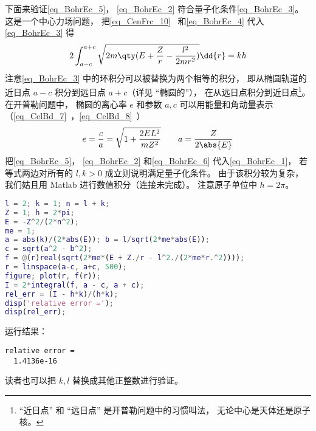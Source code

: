 下面来验证\autoref{eq_BohrEc_5}， \autoref{eq_BohrEc_2} 符合量子化条件\autoref{eq_BohrEc_3}。 这是一个中心力场问题， 把\autoref{eq_CenFrc_10}~ 和\autoref{eq_BohrEc_4}  代入\autoref{eq_BohrEc_3} 得
\begin{equation}\label{eq_BohrEc_1}
2\int_{a-c}^{a+c} \sqrt{2m\qty(E + \frac{Z}{r} - \frac{l^2}{2mr^2})} \dd{r} = kh
\end{equation}
注意\autoref{eq_BohrEc_3} 中的环积分可以被替换为两个相等的积分， 即从椭圆轨道的近日点 $a-c$ 积分到远日点 $a+c$（详见 “椭圆的”）， 在从远日点积分到近日点\footnote{“近日点” 和 “远日点” 是开普勒问题中的习惯叫法， 无论中心是天体还是原子核。}。 在开普勒问题中， 椭圆的离心率 $e$ 和参数 $a, c$ 可以用能量和角动量表示（\autoref{eq_CelBd_7}~，\autoref{eq_CelBd_8}~）
\begin{equation}\label{eq_BohrEc_6}
e = \frac{c}{a} = \sqrt{1 + \frac{2EL^2}{mZ^2}}
\qquad
a = \frac{Z}{2\abs{E}}
\end{equation}
把\autoref{eq_BohrEc_5}， \autoref{eq_BohrEc_2} 和\autoref{eq_BohrEc_6} 代入\autoref{eq_BohrEc_1}， 若等式两边对所有的 $l,k > 0$ 成立则说明满足量子化条件。 由于该积分较为复杂， 我们姑且用 Matlab 进行数值积分（连接未完成）。 注意原子单位中 $h = 2\pi$。
\begin{lstlisting}[language=matlab]
l = 2; k = 1; n = l + k;
Z = 1; h = 2*pi;
E = -Z^2/(2*n^2);
me = 1;
a = abs(k)/(2*abs(E)); b = l/sqrt(2*me*abs(E));
c = sqrt(a^2 - b^2);
f = @(r)real(sqrt(2*me*(E + Z./r - l^2./(2*me*r.^2))));
r = linspace(a-c, a+c, 500);
figure; plot(r, f(r));
I = 2*integral(f, a - c, a + c);
rel_err = (I - h*k)/(h*k);
disp('relative error =');
disp(rel_err);
\end{lstlisting}
运行结果： 
\begin{lstlisting}[language=matlabC]
relative error =
  1.4136e-16
\end{lstlisting}
读者也可以把 $k, l$ 替换成其他正整数进行验证。

